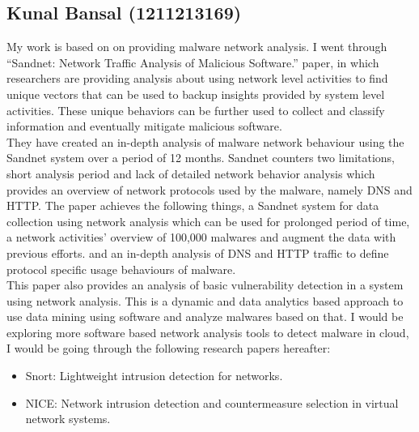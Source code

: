 \documentclass[16pt]{article}
\begin{document}
		\subsection{Kunal Bansal (1211213169)}
		My work is based on on providing malware network analysis. I went through “Sandnet: Network Traffic Analysis of Malicious Software.” paper, in which researchers are providing analysis about using network level activities to find unique vectors that can be used to backup insights provided by system level activities. These unique behaviors can be further used to collect and classify information and eventually mitigate malicious software.\\
		They have created an in-depth analysis of malware network behaviour using the Sandnet system over a period of 12 months. Sandnet counters two limitations, short analysis period and lack of detailed network behavior analysis which provides an overview of network protocols used by the malware, namely DNS and HTTP. The paper achieves the following things, a Sandnet system for data collection using network analysis which can be used for prolonged period of time, a network activities’ overview of 100,000 malwares and augment the data with previous efforts.
		and an in-depth analysis of DNS and HTTP traffic to define protocol specific usage behaviours of malware.\\
		
		This paper also provides an analysis of basic vulnerability detection in a system using network analysis. This is a dynamic and data analytics based approach to use data mining using software and analyze malwares based on that. I would be exploring more software based network analysis tools to detect malware in cloud, I would be going through the following research papers hereafter:
		\begin{itemize}
			\item Snort: Lightweight intrusion detection for networks.~\cite{roesch1999snort}
			\item NICE: Network intrusion detection and countermeasure selection in virtual network systems.~\cite{chung2013nice}
		\end{itemize}
\end{document}
